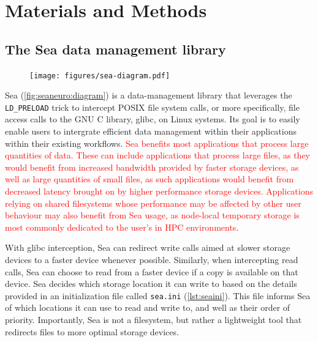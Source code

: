 \documentclass[pdflatex,sn-mathphys-num]{sn-jnl}
\newcommand{\vhs}[1]{\textcolor{red}{#1}}
\theoremstyle{thmstyleone}%
\theoremstyle{thmstyletwo}%
\theoremstyle{thmstylethree}%
\begin{document}
    
    
    
    \section{Materials and Methods}


    \subsection{The Sea data management library}
    
\begin{figure}[t]

    \centering
    \texttt{[image: figures/sea-diagram.pdf]}%
    \captionsetup{justification=centering}
    \label{fig:seaneuro:diagram}
\end{figure}


    Sea (\autoref{fig:seaneuro:diagram}) is a data-management library that leverages
    the \texttt{LD\_PRELOAD}
    trick to intercept POSIX file system calls, or more specifically, file access calls to the GNU C library,
    glibc, on Linux systems. Its goal is to easily enable users to intergrate efficient data management within their
    applications within their existing workflows. \vhs{Sea benefits most applications that process large quantities of data. These can include applications that process large files, as they would benefit from increased bandwidth provided by faster storage devices, as well as large quantities of small files, as such applications would benefit from decreased latency brought on by higher performance storage devices. Applications relying on shared filesystems whose performance may be affected by other user behaviour may also benefit from Sea usage, as node-local temporary storage is most commonly dedicated to the user's in HPC environments}.
    
    With glibc interception, Sea can redirect write calls
    aimed at slower storage devices to a faster device whenever possible.
    Similarly, when intercepting read calls, Sea can choose to read from a
    faster device if a copy is available on that device. Sea decides which
    storage location it can write to based on the details provided in an
    initialization file called \texttt{sea.ini} (\autoref{lst:seaini}). This file informs Sea of which
    locations it can use to read and write to, and well as their order of
    priority. Importantly, Sea is not a filesystem, but rather a
    lightweight tool that redirects files to more optimal storage devices.
\end{document}
